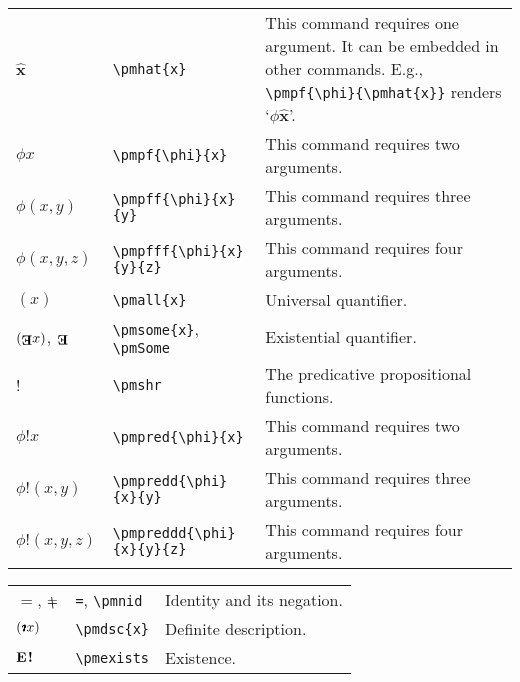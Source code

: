 \documentclass[12pt]{article}
\newcommand{\pmall}[1]{(#1)}
\newcommand{\pmsome}[1]{(\text{\raisebox{.5em}{\rotatebox{180}{\textbf{E}}}}#1)} %
\newcommand{\pmSome}{\text{\raisebox{.5em}{\rotatebox{180}{\textbf{E}}}}}
\newcommand{\pmhat}[1]{\mathbf{\hat{\text{$#1$}}}}
\newcommand{\pmpf}[2]{#1#2} %
\newcommand{\pmpff}[3]{#1(#2, #3)} %
\newcommand{\pmpfff}[4]{#1(#2, #3, #4)} %
\newcommand{\pmshr}{\textbf{!}} %
\newcommand{\pmpred}[2]{#1\pmshr#2} %
\newcommand{\pmpredd}[3]{#1\pmshr(#2, #3)} %
\newcommand{\pmpreddd}[4]{#1\pmshr(#2, #3, #4)} %
\newcommand{\pmnid}{\mathrel{\ooalign{$=$\cr\hidewidth\footnotesize\rotatebox[origin=c]{210}{\textbf{/}}\hidewidth\cr}}} %
\newcommand{\pmiota}{\ooalign{\rotatebox[origin=c]{180}{$\mathbf{\iota}$}\cr\hidewidth\raisebox{.0125em}{\rotatebox[origin=c]{180}{$\mathbf{\iota}$}}\cr\hidewidth\raisebox{.025em}{\rotatebox[origin=c]{180}{$\mathbf{\iota}$}}\cr\hidewidth\raisebox{.0375em}{\rotatebox[origin=c]{180}{$\mathbf{\iota}$}}\cr\hidewidth\raisebox{.05em}{\rotatebox[origin=c]{180}{$\mathbf{\iota}$}}}} %
\newcommand{\pmdsc}[1]{(\pmiota#1)} %
\newcommand{\pmexists}{\textbf{E}\hspace{.1em}\pmshr} %
\begin{document}
\begin{tabular}{@{}p{3cm} | p{5cm} | p{8.25cm}}
	$\pmhat{x}$ & \verb|\pmhat{x}| & This command requires one argument. It can be embedded in other commands. E.g., \verb|\pmpf{\phi}{\pmhat{x}}| renders `$\pmpf{\phi}{\pmhat{x}}$'. \\
	$\pmpf{\phi}{x}$ & \verb|\pmpf{\phi}{x}| & This command requires two arguments. \\
	$\pmpff{\phi}{x}{y}$ & \verb|\pmpff{\phi}{x}{y}| & This command requires three arguments. \\
	$\pmpfff{\phi}{x}{y}{z}$ & \verb|\pmpfff{\phi}{x}{y}{z}| & This command requires four arguments. \\
	$\pmall{x}$ &\verb|\pmall{x}| & Universal quantifier. \\
	$\pmsome{x}$, $\pmSome$ & \verb|\pmsome{x}|, \verb|\pmSome| & Existential quantifier. \\
	$\pmshr$ & \verb|\pmshr| & The predicative propositional functions. \\
	$\pmpred{\phi}{x}$ & \verb|\pmpred{\phi}{x}| & This command requires two arguments. \\
	$\pmpredd{\phi}{x}{y}$ & \verb|\pmpredd{\phi}{x}{y}| & This command requires three arguments. \\
	$\pmpreddd{\phi}{x}{y}{z}$ & \verb|\pmpreddd{\phi}{x}{y}{z}| & This command requires four arguments.
\end{tabular}

\noindent \begin{tabular}{@{}p{3cm} | p{5cm} | p{8.25cm}}
	$=$, $\pmnid$ & \verb|=|, \verb|\pmnid| & Identity and its negation. \\
	$\pmdsc{x}$ & \verb|\pmdsc{x}| & Definite description. \\
	$\pmexists$ & \verb|\pmexists| & Existence. 
\end{tabular}
\end{document}

